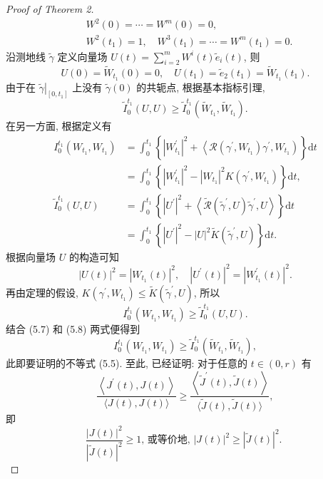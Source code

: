 \documentclass{ctexart}
\begin{document}
\begin{proof}[Proof of Theorem 2]
$$\begin{aligned}
  & W^2(0)=\cdots=W^m(0)=0, \\
  & W^2\left(t_1\right)=1, \quad W^3\left(t_1\right)=\cdots=W^m\left(t_1\right)=0 .
  \end{aligned}
  $$
  沿测地线 $\tilde{\gamma}$ 定义向量场 $U(t)=\sum_{i=2}^m W^i(t) \tilde{e}_i(t)$, 则
  $$
  U(0)=\tilde{W}_{t_1}(0)=0, \quad U\left(t_1\right)=\tilde{e}_2\left(t_1\right)=\tilde{W}_{t_1}\left(t_1\right) .
  $$
  由于在 $\left.\tilde{\gamma}\right|_{\left[0, t_1\right]}$ 上没有 $\tilde{\gamma}(0)$ 的共轭点, 根据基本指标引理,
  $$
  \tilde{I}_0^{t_1}(U, U) \geq \tilde{I}_0^{t_1}\left(\tilde{W}_{t_1}, \tilde{W}_{t_1}\right) .
  $$
  在另一方面, 根据定义有
  $$
  \begin{aligned}
  I_0^{t_1}\left(W_{t_1}, W_{t_1}\right) & =\int_0^{t_1}\left\{\left|W_{t_1}^{\prime}\right|^2+\left\langle\mathcal{R}\left(\gamma^{\prime}, W_{t_1}\right) \gamma^{\prime}, W_{t_1}\right)\right\} \mathrm{d} t \\
  & =\int_0^{t_1}\left\{\left|W_{t_1}^{\prime}\right|^2-\left|W_{t_1}\right|^2 K\left(\gamma^{\prime}, W_{t_1}\right)\right\} \mathrm{d} t, \\
  \tilde{I}_0^{t_1}(U, U) & =\int_0^{t_1}\left\{\left|U^{\prime}\right|^2+\left\langle\tilde{\mathcal{R}}\left(\tilde{\gamma}^{\prime}, U\right) \tilde{\gamma}^{\prime}, U\right\rangle\right\} \mathrm{d} t \\
  & =\int_0^{t_1}\left\{\left|U^{\prime}\right|^2-|U|^2 \tilde{K}\left(\tilde{\gamma}^{\prime}, U\right)\right\} \mathrm{d} t .
  \end{aligned}
  $$
  根据向量场 $U$ 的构造可知
  $$
  |U(t)|^2=\left|W_{t_1}(t)\right|^2, \quad\left|U^{\prime}(t)\right|^2=\left|W_{t_1}^{\prime}(t)\right|^2 .
  $$
  再由定理的假设, $K\left(\gamma^{\prime}, W_{t_1}\right) \leq \tilde{K}\left(\tilde{\gamma}^{\prime}, U\right)$, 所以
  $$
  I_0^{t_1}\left(W_{t_1}, W_{t_1}\right) \geq \tilde{I}_0^{t_1}(U, U) .
  $$
  结合 (5.7) 和 (5.8) 两式便得到
  $$
  I_0^{t_1}\left(W_{t_1}, W_{t_1}\right) \geq \tilde{I}_0^{t_1}\left(\tilde{W}_{t_1}, \tilde{W}_{t_1}\right),
  $$
  此即要证明的不等式 (5.5).
  至此, 已经证明: 对于任意的 $t \in(0, r)$ 有
  $$
  \frac{\left\langle J^{\prime}(t), J(t)\right\rangle}{\langle J(t), J(t)\rangle} \geq \frac{\left\langle\tilde{J}^{\prime}(t), \tilde{J}(t)\right\rangle}{\langle\tilde{J}(t), \tilde{J}(t)\rangle},
  $$
  即
  $$
  \frac{|J(t)|^2}{|\tilde{J}(t)|^2} \geq 1 \text {, 或等价地, }|J(t)|^2 \geq|\tilde{J}(t)|^2 \text {. }
  $$
\end{proof}
\end{document}
